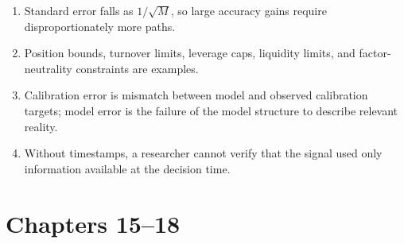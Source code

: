 \begin{enumerate}
  \item[14.1] Standard error falls as $1/\sqrt M$, so large accuracy gains require disproportionately more paths.
  \item[14.2] Position bounds, turnover limits, leverage caps, liquidity limits, and factor-neutrality constraints are examples.
  \item[14.3] Calibration error is mismatch between model and observed calibration targets; model error is the failure of the model structure to describe relevant reality.
  \item[14.4] Without timestamps, a researcher cannot verify that the signal used only information available at the decision time.
\end{enumerate}

\section*{Chapters 15--18}
